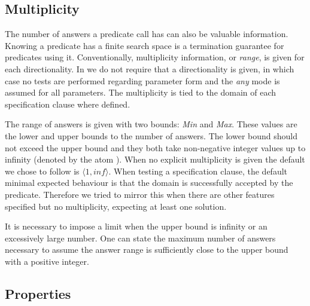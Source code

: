 
\subsection{Multiplicity}
The number of answers a predicate call has can also be valuable
information.
%
Knowing a predicate has a finite search space is a termination
guarantee for predicates using it.
%
Conventionally, multiplicity information, or \emph{range}, is given for
each directionality.
%
In \plqc{} we do not require that a directionality is given, in which
case no tests are performed regarding parameter form and the \emph{any}
mode is assumed for all parameters.
%
The multiplicity is tied to the domain of each specification clause
where defined.


The range of answers is given with two bounds: \emph{Min} and
\emph{Max}.
%
These values are the lower and upper bounds to the number of answers.
%
The lower bound should not exceed the upper bound and they both take
non-negative integer values up to infinity (denoted by the atom
).
%
When no explicit multiplicity is given the default we chose to follow is
$\langle 1, inf \rangle $.
%
When testing a specification clause, the default minimal expected
behaviour is that the domain is successfully accepted by the predicate.
%
Therefore we tried to mirror this when there are other features
specified but no multiplicity, expecting at least one solution.


It is necessary to impose a limit when the upper bound is infinity or an
excessively large number.
%
One can state the maximum number of answers necessary to assume the
answer range is sufficiently close to the upper bound with a positive
integer.

\subsection{Properties}

